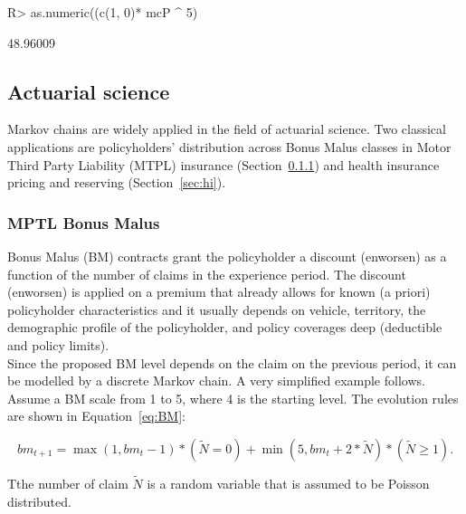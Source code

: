 \documentclass[nojss]{jss}
\begin{document}
\begin{Schunk}
\begin{Sinput}
R> as.numeric((c(1, 0)* mcP ^ 5) %*% (as.vector(c(c1, c2))))
\end{Sinput}
\begin{Soutput}
[1] 48.96009
\end{Soutput}
\end{Schunk}
\subsection{Actuarial science}\label{app:act}

Markov chains are widely applied in the field of actuarial science. Two
classical applications are policyholders' distribution across Bonus Malus
classes in Motor Third Party Liability (MTPL) insurance (Section~\ref{sec:bm}) and health insurance pricing and reserving 
(Section~\ref{sec:hi}).


\subsubsection{MPTL Bonus Malus}\label{sec:bm}

Bonus Malus (BM) contracts grant the policyholder a discount (enworsen) as a
function of the number of claims in the experience period. The discount (enworsen) is applied on a premium that 
already allows for known (a priori) policyholder characteristics \citep{denuit2007actuarial}
and it usually depends on vehicle, territory, the demographic profile of the policyholder, and policy coverages deep (deductible and policy limits).\\
Since the proposed BM level depends on the claim on the previous period, it can
be modelled by a discrete Markov chain. A very simplified example follows.
Assume a BM scale from 1 to 5, where 4 is the starting level. The evolution rules are shown in Equation~\ref{eq:BM}:

\begin{equation}
bm_{t + 1} = \max \left( {1,bm_{t} - 1} \right)*\left( {\tilde N = 0} \right) + \min \left( {5,bm_{t} + 2*\tilde N} \right)*\left( {\tilde N \ge 1} \right).
\label{eq:BM}
\end{equation}

Tthe number of claim $\tilde N$  is a random variable that is assumed
to be Poisson distributed.
\end{document}
